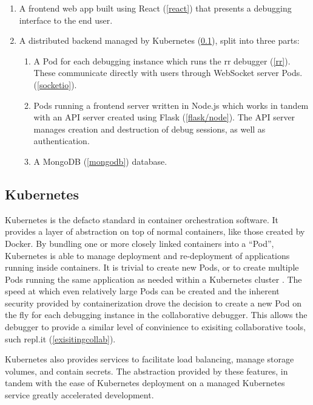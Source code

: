 \documentclass[12pt]{article}
\begin{document}
\begin{enumerate}
\item A frontend web app built using React (\ref{react}) that presents a debugging
  interface to the end user.
\item A distributed backend managed by Kubernetes (\ref{k8s}), split into three parts:
  \begin{enumerate}
  \item A Pod for each debugging instance which runs the rr debugger
    (\ref{rr}).  These communicate directly with users through
    WebSocket server Pods. (\ref{socketio}).
  \item Pods running a frontend server written in Node.js which works
    in tandem with an API server created using Flask
    (\ref{flask/node}).  The API server manages creation and
    destruction of debug sessions, as well as authentication.
  \item A MongoDB (\ref{mongodb}) database.
  \end{enumerate}
\end{enumerate}

\subsection{Kubernetes}\label{k8s}

Kubernetes is the defacto standard in container orchestration
software.  It provides a layer of abstraction on top of normal
containers, like those created by Docker.  By bundling one or more
closely linked containers into a ``Pod'', Kubernetes is able to manage
deployment and re-deployment of applications running inside
containers.  It is trivial to create new Pods, or to create multiple
Pods running the same application as needed within a Kubernetes
cluster \cite{k8s}.  The speed at which even relatively large Pods can
be created and the inherent security provided by containerization
drove the decision to create a new Pod on the fly for each debugging
instance in the collaborative debugger.  This allows the debugger to
provide a similar level of convinience to exisiting collaborative
tools, such repl.it (\ref{exisitingcollab}).
\par

Kubernetes also provides services to facilitate load balancing, manage
storage volumes, and contain secrets.  The abstraction provided by
these features, in tandem with the ease of Kubernetes deployment on a
managed Kubernetes service\cite{do_managed_k8s} greatly accelerated
development.
\end{document}
